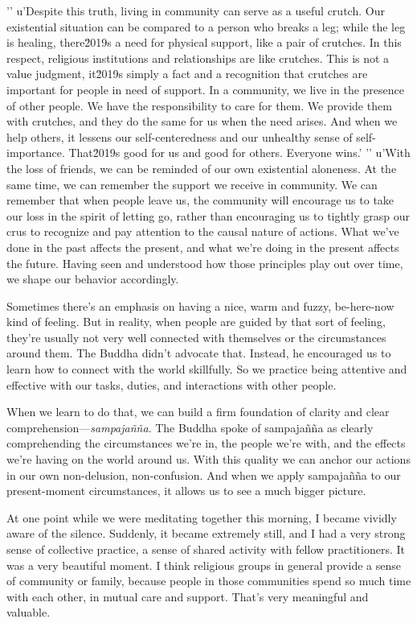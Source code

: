 '\n'
u'Despite this truth, living in community can serve as a useful crutch. Our existential situation can be compared to a person who breaks a leg; while the leg is healing, there\u2019s a need for physical support, like a pair of crutches. In this respect, religious institutions and relationships are like crutches. This is not a value judgment, it\u2019s simply a fact and a recognition that crutches are important for people in need of support. In a community, we live in the presence of other people. We have the responsibility to care for them. We provide them with crutches, and they do the same for us when the need arises. And when we help others, it lessens our self-centeredness and our unhealthy sense of self-importance. That\u2019s good for us and good for others. Everyone wins.'
'\n'
u'With the loss of friends, we can be reminded of our own existential aloneness. At the same time, we can remember the support we receive in community. We can remember that when people leave us, the community will encourage us to take our loss in the spirit of letting go, rather than encouraging us to tightly grasp our crus to recognize and pay 
attention to the causal nature of actions. What we've done in the past 
affects the present, and what we're doing in the present affects the 
future. Having seen and understood how those principles play out over 
time, we shape our behavior accordingly.

Sometimes there's an emphasis on having a nice, warm and fuzzy, 
be-here-now kind of feeling. But in reality, when people are guided by 
that sort of feeling, they're usually not very well connected with 
themselves or the circumstances around them. The Buddha didn't advocate 
that. Instead, he encouraged us to learn how to connect with the world 
skillfully. So we practice being attentive and effective with our 
tasks, duties, and interactions with other people.

When we learn to do that, we can build a firm foundation of clarity and 
clear comprehension---\emph{sampajañña}. The Buddha spoke of 
sampajañña as clearly comprehending the circumstances we're in, the 
people we're with, and the effects we're having on the world around us. 
With this quality we can anchor our actions in our own non-delusion, 
non-confusion. And when we apply sampajañña to our present-moment 
circumstances, it allows us to see a much bigger picture.


At one point while we were meditating together this morning, I became 
vividly aware of the silence. Suddenly, it became extremely still, and 
I had a very strong sense of collective practice, a sense of shared 
activity with fellow practitioners. It was a very beautiful moment. I 
think religious groups in general provide a sense of community or 
family, because people in those communities spend so much time with 
each other, in mutual care and support. That's very meaningful and 
valuable.

